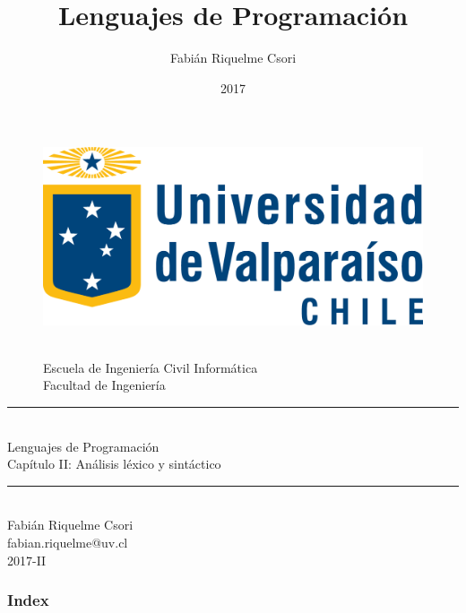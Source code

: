 \documentclass[handout]{beamer} %
\title{Lenguajes de Programación}                     %
\author{Fabián Riquelme Csori}                        %
\date{2017}                                           %
\institute{Universidad de Valparaíso}                 %
\newcommand{\HRule}{\rule{\linewidth}{0.2mm}\\[1ex]}
\begin{document}
%

\begin{frame}[plain]
  \begin{figure}[h]
    \begin{minipage}{0.3\textwidth}
    \includegraphics[width=.9\textwidth]{./image/logo-UV.png}
    \end{minipage}
    \begin{minipage}{0.65\textwidth}
     $~$\\[3.6ex]
     \footnotesize{Escuela de Ingeniería Civil Informática}\\
     \footnotesize{Facultad de Ingeniería}
    \end{minipage}
  \end{figure}
  \begin{center}
    \vspace{1ex}
    \HRule
    \Large{Lenguajes de Programación}\\{\small Capítulo II: Análisis léxico y sintáctico}\\[-1ex]
    \HRule\vspace{1ex}
    \large{Fabián Riquelme Csori}\\[.5ex]\footnotesize{fabian.riquelme@uv.cl}\\[6ex] {\tiny 2017-II}\\[6ex]
  \end{center}
\end{frame}

\begin{frame}
 \frametitle{Index}
 \scriptsize 			%
 \tableofcontents		%
\end{frame}
\end{document}
